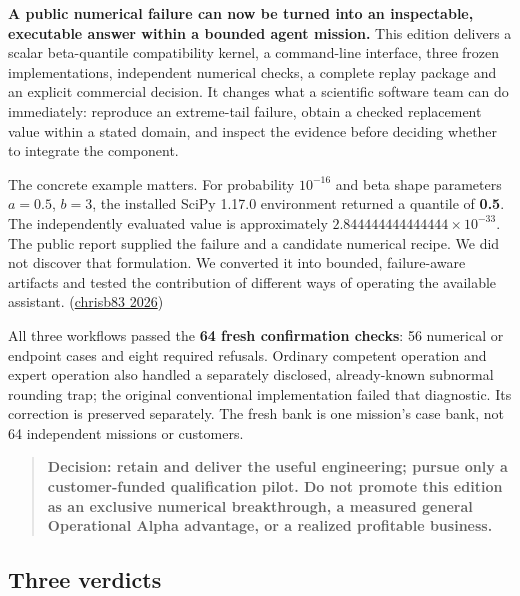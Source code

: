 \documentclass[
  10pt,
]{article}
\begin{document}
\textbf{A public numerical failure can now be turned into an
inspectable, executable answer within a bounded agent mission.} This
edition delivers a scalar beta-quantile compatibility kernel, a
command-line interface, three frozen implementations, independent
numerical checks, a complete replay package and an explicit commercial
decision. It changes what a scientific software team can do immediately:
reproduce an extreme-tail failure, obtain a checked replacement value
within a stated domain, and inspect the evidence before deciding whether
to integrate the component.

The concrete example matters. For probability \(10^{-16}\) and beta
shape parameters \(a=0.5\), \(b=3\), the installed SciPy 1.17.0
environment returned a quantile of \textbf{0.5}. The independently
evaluated value is approximately
\textbf{\(2.844444444444444\times10^{-33}\)}. The public report supplied
the failure and a candidate numerical recipe. We did not discover that
formulation. We converted it into bounded, failure-aware artifacts and
tested the contribution of different ways of operating the available
assistant. (\protect\hyperlink{ref-scipyissue}{chrisb83 2026})

All three workflows passed the \textbf{64 fresh confirmation checks}: 56
numerical or endpoint cases and eight required refusals. Ordinary
competent operation and expert operation also handled a separately
disclosed, already-known subnormal rounding trap; the original
conventional implementation failed that diagnostic. Its correction is
preserved separately. The fresh bank is one mission's case bank, not 64
independent missions or customers.

\begin{quote}
\textbf{Decision: retain and deliver the useful engineering; pursue only
a customer-funded qualification pilot. Do not promote this edition as an
exclusive numerical breakthrough, a measured general Operational Alpha
advantage, or a realized profitable business.}
\end{quote}

\hypertarget{three-verdicts}{%
\subsection{Three verdicts}\label{three-verdicts}}
\end{document}
